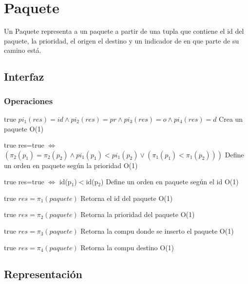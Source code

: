 \section{Paquete}

Un Paquete representa a un paquete a partir de una tupla que contiene el id del paquete, la prioridad, el origen el destino y un indicador de en que parte de su camino est\'a. 

\subsection{Interfaz}



\subsubsection*{Operaciones}

 {true}
 {$pi_1(res)=id \land pi_2(res)=pr \land pi_3(res)=o \land pi_4(res)=d$}
 {Crea un paquete}
 {O(1)}
 {}
 
 {true}
 {res=true $\iff$ $(\pi_2(p_1)=\pi_2(p_2) \land pi_1(p_1)<pi_1(p_2) \lor (\pi_1(p_1)<\pi_1(p_2)))$}
 {Define un orden en paquete seg\'un la prioridad}
 {O(1)}
 {}
 
 {true}
 {res=true $\iff$ id(p$_1$)$<$id(p$_2$)}
 {Define un orden en paquete seg\'un el id}
 {O(1)}
 {}
 
 {true}
 {$res = \pi_1(paquete)$}
 {Retorna el id del paquete}
 {O(1)}
 {}
 
 {true}
 {$res = \pi_2(paquete)$}
 {Retorna la prioridad del paquete}
 {O(1)}
 {}
 
 {true}
 {$res = \pi_3(paquete)$}
 {Retorna la compu donde se inserto el paquete}
 {O(1)}
 {}
 
 {true}
 {$res = \pi_4(paquete)$}
 {Retorna la compu destino}
 {O(1)}
 {}
\subsection{Representación}

